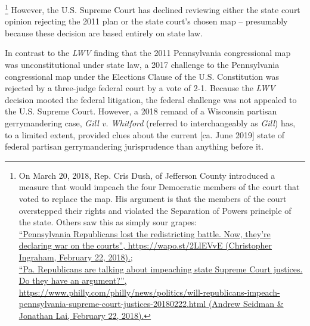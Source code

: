         \footnote{On March 20, 2018, Rep. Cris Dush, of Jefferson County introduced a measure that would impeach the four Democratic members of the court that voted to replace the map. His argument is that the members of the court overstepped their rights and violated the Separation of Powers principle of the state. Others saw this as simply sour grapes: \\ \href{https://wapo.st/2LlEVvE}{``Pennsylvania Republicans lost the redistricting battle. Now, they’re declaring war on the courts'', https://wapo.st/2LlEVvE (Christopher Ingraham, February 22, 2018).;} \\ \href{https://www.philly.com/philly/news/politics/will-republicans-impeach-pennsylvania-supreme-court-justices-20180222.html}{``Pa. Republicans are talking about impeaching state Supreme Court justices. Do they have an argument?'', https://www.philly.com/philly/news/politics/will-republicans-impeach-pennsylvania-supreme-court-justices-20180222.html (Andrew Seidman \& Jonathan Lai, February 22, 2018).}}
    However, the U.S. Supreme Court has declined reviewing either the state court opinion rejecting the 2011 plan or the state court’s chosen map -- presumably because these decision are based entirely on state law.
\par
    In contrast to the \textit{LWV} finding that the 2011 Pennsylvania congressional map was unconstitutional under state law, a 2017 challenge to the Pennsylvania congressional map under the Elections Clause of the U.S. Constitution was rejected by a three-judge federal court by a vote of 2-1. Because the \textit{LWV} decision mooted the federal litigation, the federal challenge was not appealed to the U.S. Supreme Court. However, a 2018 remand of a Wisconsin partisan gerrymandering case, \textit{Gill v. Whitford} (referred to interchangeably as \textit{Gill}) has, to a limited extent, provided clues about the current [ca. June 2019] state of federal partisan gerrymandering jurisprudence than anything before it.

